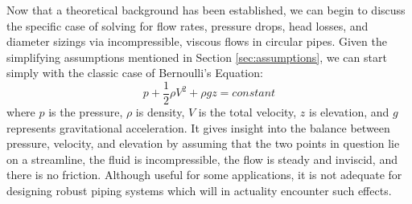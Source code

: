 \documentclass[11pt]{article} %
\numberwithin{equation}{section} %
\begin{document}
Now that a theoretical background has been established, we can begin to discuss the specific case of solving for flow rates, pressure drops, head losses, and diameter sizings via incompressible, viscous flows in circular pipes. Given the simplifying assumptions mentioned in Section \ref{sec:assumptions}, we can start simply with the classic case of Bernoulli's Equation:
\begin{equation} \label{eq:bernoulli}
p + \frac{1}{2} \rho V^{2} + \rho g z = constant
\end{equation}
where $p$ is the pressure, $\rho$ is density, $V$ is the total velocity, $z$ is elevation, and $g$ represents gravitational acceleration. It gives insight into the balance between pressure, velocity, and elevation by assuming that the two points in question lie on a streamline, the fluid is incompressible, the flow is steady and inviscid, and there is no friction. Although useful for some applications, it is not adequate for designing robust piping systems which will in actuality encounter such effects.
\end{document}
